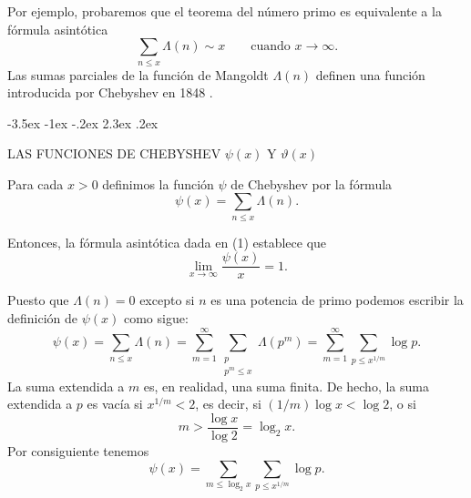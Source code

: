 \documentclass[12pt,a4paper]{book}
\makeatletter
\renewcommand\section{\@startsection{section}{1}{\z@}%
  {-3.5ex \@plus -1ex \@minus -.2ex}%
  {2.3ex \@plus .2ex}%
  {\normalfont\Large\bfseries\raggedright}}
\makeatother
\begin{document}
    Por ejemplo, probaremos que el teorema del número primo es equivalente a la
    fórmula asintótica
    \begin{equation}
        \sum_{n\leq x}\Lambda(n)\sim x\qquad\text{cuando } x\to\infty.
    \end{equation}
    Las sumas parciales de la función de Mangoldt $\Lambda(n)$ definen una función
    introducida por Chebyshev en 1848 \cite{chebyshev1851}.

    \section{LAS FUNCIONES DE CHEBYSHEV \texorpdfstring{$\psi(x)$}{ψ(x)} Y \texorpdfstring{$\vartheta(x)$}{ϑ(x)}}

    \begin{definicion}\label{sim:psi}
        Para cada $x>0$ definimos la función $\psi$ de Chebyshev por la fórmula
        \begin{equation*}
            \psi(x)=\sum_{n\leq x}\Lambda(n).
        \end{equation*}
    \end{definicion}

    Entonces, la fórmula asintótica dada en (1) establece que
    \begin{equation}
        \lim_{x\to\infty}\frac{\psi(x)}{x}=1.
    \end{equation}

    Puesto que $\Lambda(n)=0$ excepto si $n$ es una potencia de primo podemos escribir
    la definición de $\psi(x)$ como sigue:
    \begin{equation*}
        \psi(x)=\sum_{n\leq x}\Lambda(n)=\sum_{m=1}^{\infty}\sum_{\substack{p\\ p^{m}\leq x}}\Lambda(p^{m})
        =\sum_{m=1}^{\infty}\sum_{p\leq x^{1/m}}\log p.
    \end{equation*}
    La suma extendida a $m$ es, en realidad, una suma finita. De hecho, la suma
    extendida a $p$ es vacía si $x^{1/m}<2$, es decir, si $(1/m)\log x<\log2$, o si
    \begin{equation*}
        m>\frac{\log x}{\log2}=\log_{2}x.
    \end{equation*}
    Por consiguiente tenemos
    \begin{equation*}
        \psi(x)=\sum_{m\leq\log_{2}x}\sum_{p\leq x^{1/m}}\log p.
    \end{equation*}
\end{document}
